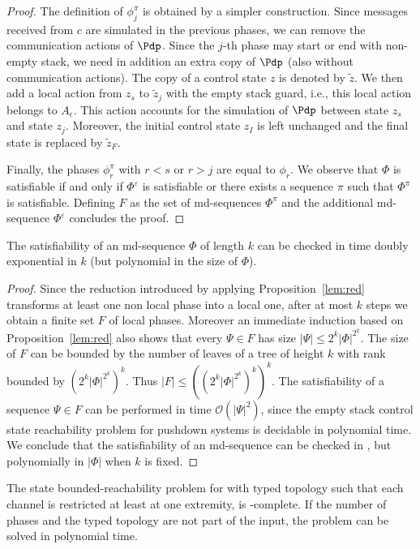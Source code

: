 \documentclass{LMCS}
\newenvironment{theorem}{\begin{thm}}{\end{thm}}
\newenvironment{corollary}{\begin{cor}}{\end{cor}}
\begin{document}
\begin{proof}
  The definition of $\phi_j^\pi$ is obtained by a simpler
  construction. Since messages received from $c$ are simulated
  in the previous phases, we can remove the communication actions of
  $\Pdp$. Since the $j$-th phase may start or end with non-empty
  stack, we need in addition an extra copy of $\Pdp$  (also without communication actions). The copy of a
  control state $z$ is denoted by $\tilde{z}$. We then add a local action
  from $z_s$ to $\tilde{z}_j$ with the empty stack guard, i.e., this
  local action belongs to $A_\epsilon$. This action accounts for the
  simulation of $\Pdp$ between state $z_s$ and state $z_j$.
  Moreover, the initial control state $z_{I}$
  is left unchanged
and the final state is   replaced by $\tilde{z}_F$.

  Finally, the phases $\phi_r^\pi$ with $r<s$ or $r>j$ are equal
  to $\phi_r$. We observe that $\Phi$ is satisfiable if and only if
  $\Phi^\varepsilon$ is satisfiable or there exists a sequence $\pi$ such that $\Phi^\pi$ is
  satisfiable. Defining   $F$ as the set of md-sequences
  $\Phi^\pi$ and the additional md-sequence $\Phi^\varepsilon$ concludes the proof.
\end{proof}


\begin{corollary}\label{cor:sat}
  The satisfiability of an md-sequence $\Phi$ of length $k$ can be
  checked in time doubly exponential in $k$ (but polynomial in
 the size of  $\Phi$).
\end{corollary}

\begin{proof}
  Since the reduction introduced by applying Proposition~\ref{lem:red}
  transforms at least one non local phase into a local one,
  after at most $k$ steps we obtain a finite set $F$ of local
  phases. Moreover an immediate induction based on Proposition~\ref{lem:red}
  also shows that every $\Psi\in F$ has size $|\Psi|\leq
  2^k|\Phi|^{2^k}$. The size of $F$ can be bounded by the number
  of leaves of a tree of height $k$ with rank bounded by
  $(2^k|\Phi|^{2^k})^k$. Thus $|F|\leq ((2^k|\Phi|^{2^k})^k)^k$. The
  satisfiability of a sequence $\Psi\in F$ can be performed in time
  $\mathcal{O}(|\Psi|^2)$, since the empty stack control state reachability
  problem for pushdown systems is decidable in polynomial time. We
  conclude that the satisfiability of an md-sequence can be checked in
  \twodexptime, but polynomially in $|\Phi|$ when $k$ is fixed.
\end{proof}

\begin{theorem}\label{th:bounded}



The state bounded-reachability problem for \rqcp with typed topology
such that each channel is restricted at least at one extremity, is
\twodexptime-complete. If the number of phases and the typed topology are not part of the
input, the problem can be solved in polynomial time.
\end{theorem}
\end{document}
